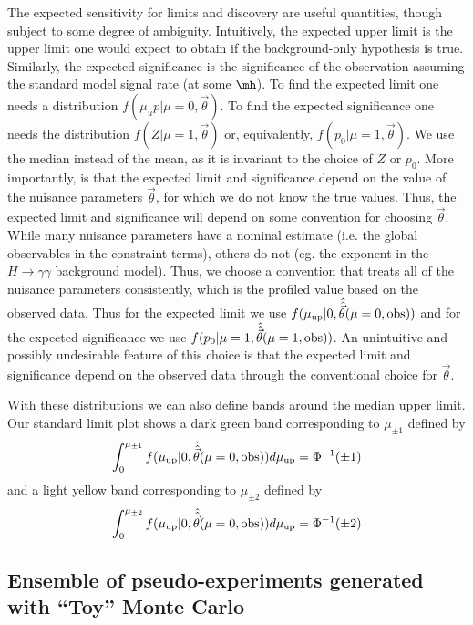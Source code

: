 The expected sensitivity for limits and discovery are useful quantities, though subject to some degree of ambiguity.  Intuitively, the expected upper limit is the upper limit one would expect to obtain if the background-only hypothesis is true.  Similarly, the expected significance is the significance of the observation assuming the standard model signal rate (at some $\mh$).  To find the expected limit one needs a distribution $f(\mu_up | \mu=0,\vec\theta)$.  To find the expected significance one needs the distribution $f(Z | \mu=1,\vec\theta)$ or, equivalently, $f(p_0 | \mu=1,\vec\theta)$.  We use the median instead of the mean, as it is invariant to the choice of $Z$ or $p_0$.  More importantly, is that the expected limit and significance depend on the value of the nuisance parameters $\vec\theta$, for which we do not know the true values.  Thus, the expected limit and significance will depend on some convention for choosing $\vec\theta$.  While many nuisance parameters have a nominal estimate (i.e. the global observables in the constraint terms), others do not (eg. the exponent in the $H\to\gamma\gamma$ background model).  Thus, we choose a convention that treats all of the nuisance parameters consistently, which is the profiled value based on the observed data.  Thus for  the expected limit we use $ f(\mu_{\rm up}|0,\hat{\hat{\vec{\theta}}}(\mu=0,\textrm{obs}))$ and for the expected significance we use $f(p_0 | \mu=1,\hat{\hat{\vec\theta}}(\mu=1, \rm obs))$.  An unintuitive and possibly undesirable feature of this choice is that the expected limit and significance depend on the observed data through the conventional choice for $\vec\theta$.


With these distributions we can also define bands around the median upper limit.  Our standard limit plot shows a dark green band corresponding to $\mu_{\pm 1}$ defined by 
\begin{equation}
\int_{0}^{\mu_{\pm 1}}  f(\mu_{\rm up}|0,\hat{\hat{\vec{\theta}}}(\mu=0,\textrm{obs})) d\mu_{\rm up} = \Phi^{-1}(\pm 1) 
\end{equation}
and a light yellow band corresponding to $\mu_{\pm 2}$ defined by 
\begin{equation}
\int_{0}^{\mu_{\pm 2}}  f(\mu_{\rm up}|0,\hat{\hat{\vec{\theta}}}(\mu=0,\textrm{obs})) d\mu_{\rm up} = \Phi^{-1}(\pm 2) 
\end{equation}


\subsection{Ensemble of pseudo-experiments generated with ``Toy'' Monte Carlo}


